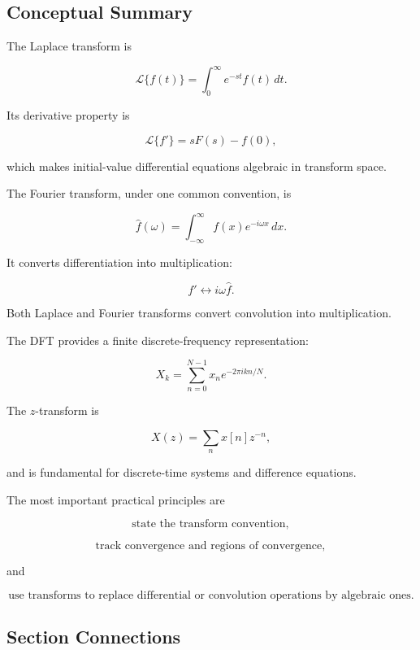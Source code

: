 \subsection{Conceptual Summary}
\label{subsec:transform-tables-summary}

The Laplace transform is

\[
\boxed{
\mathcal{L}\{f(t)\}
=
\int_0^\infty
e^{-st}f(t)\,dt.
}
\]

Its derivative property is

\[
\boxed{
\mathcal{L}\{f'\}
=
sF(s)-f(0),
}
\]

which makes initial-value differential equations algebraic in transform space.

The Fourier transform, under one common convention, is

\[
\boxed{
\widehat f(\omega)
=
\int_{-\infty}^{\infty}
f(x)e^{-i\omega x}
\,dx.
}
\]

It converts differentiation into multiplication:

\[
\boxed{
f'
\longleftrightarrow
i\omega\widehat f.
}
\]

Both Laplace and Fourier transforms convert convolution into multiplication.

The DFT provides a finite discrete-frequency representation:

\[
\boxed{
X_k
=
\sum_{n=0}^{N-1}
x_n e^{-2\pi i kn/N}.
}
\]

The \(z\)-transform is

\[
\boxed{
X(z)
=
\sum_n
x[n]z^{-n},
}
\]

and is fundamental for discrete-time systems and difference equations.

The most important practical principles are

\[
\boxed{
\text{state the transform convention},
}
\]

\[
\boxed{
\text{track convergence and regions of convergence},
}
\]

and

\[
\boxed{
\text{use transforms to replace differential or convolution operations by
algebraic ones}.
}
\]

\subsection{Section Connections}
\label{subsec:transform-tables-connections}

